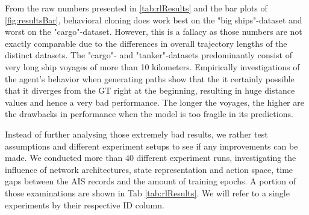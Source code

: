 From the raw numbers presented in \ref{tab:rlResults} and the bar plots of \ref{fig:resultsBar}, behavioral cloning does work best on the "big ships"-dataset and worst on the "cargo"-dataset. However, this is a fallacy as those numbers are not exactly comparable due to the differences in overall trajectory lengths of the distinct datasets. The "cargo"- and "tanker"-datasets predominantly consist of very long ship voyages of more than 10 kilometers. Empirically investigations of the agent's behavior when generating paths show that the it certainly possible that it diverges from the GT right at the beginning, resulting in huge distance values and hence a very bad performance. The longer the voyages, the higher are the drawbacks in performance when the model is too fragile in its predictions.
\par
Instead of further analysing those extremely bad results, we rather test assumptions and different experiment setups to see if any improvements can be made. We conducted more than 40 different experiment runs, investigating the influence of network architectures, state representation and action space, time gaps between the AIS records and the amount of training epochs. A portion of those examinations are shown in Tab \ref{tab:rlResults}. We will refer to a single experiments by their respective ID column.
